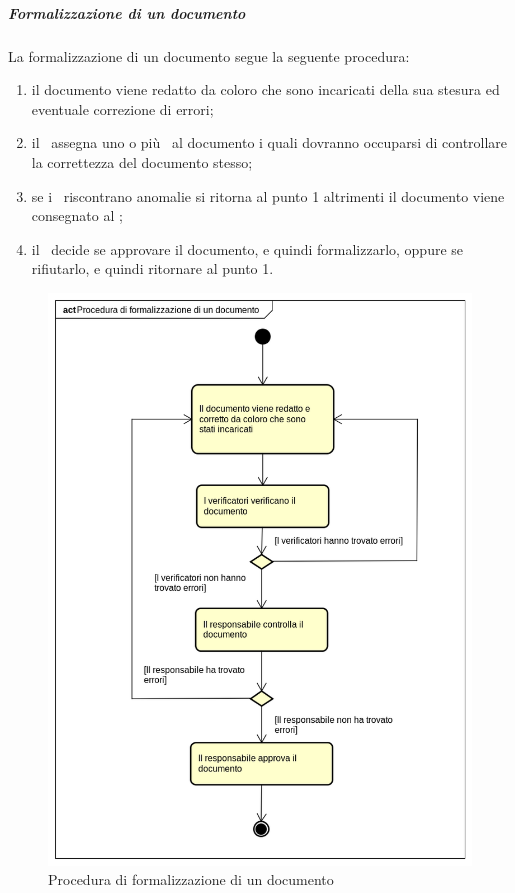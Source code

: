 \documentclass[../NormeProgetto.tex]{subfiles}
\begin{document}
				\subparagraph{Formalizzazione di un documento}
					La formalizzazione di un documento segue la seguente procedura:
					\begin{enumerate}
						\item il documento viene redatto da coloro che sono incaricati della sua stesura ed eventuale correzione di errori;
						\item il \responsabilediprogetto\ assegna uno o più \verificatori\ al documento i quali dovranno occuparsi di controllare la correttezza del documento stesso;
						\item se i \verificatori\ riscontrano anomalie si ritorna al punto 1 altrimenti il documento viene consegnato al \responsabilediprogetto;
						\item il \responsabilediprogetto\ decide se approvare il documento, e quindi formalizzarlo, oppure se rifiutarlo, e quindi ritornare al punto 1.
					\end{enumerate}
					\begin{figure}[!ht]
						\centering
						\includegraphics[scale=0.5, width=\textwidth]{sections/img/proceduraFormalizzazioneDocumento.png}
						\caption{Procedura di formalizzazione di un documento}\label{fig:Procedura di formalizzazione di un documento} 
					\end{figure}
\end{document}
